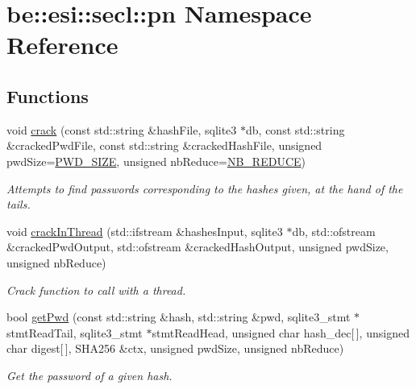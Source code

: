 \hypertarget{namespacebe_1_1esi_1_1secl_1_1pn}{}\section{be\+:\+:esi\+:\+:secl\+:\+:pn Namespace Reference}
\label{namespacebe_1_1esi_1_1secl_1_1pn}
\subsection*{Functions}
\begin{DoxyCompactItemize}
\item 
void \hyperlink{namespacebe_1_1esi_1_1secl_1_1pn_a56fa00c405a4fb0e6446717fb1390493}{crack} (const std\+::string \&hash\+File, sqlite3 $\ast$db, const std\+::string \&cracked\+Pwd\+File, const std\+::string \&cracked\+Hash\+File, unsigned pwd\+Size=\hyperlink{namespacebe_1_1esi_1_1secl_1_1pn_a233e474af3fb15b935a71709407307ec}{P\+W\+D\+\_\+\+S\+I\+ZE}, unsigned nb\+Reduce=\hyperlink{namespacebe_1_1esi_1_1secl_1_1pn_a712c184235263459041b774c8229fc1b}{N\+B\+\_\+\+R\+E\+D\+U\+CE})
\begin{DoxyCompactList}\small\item\em Attempts to find passwords corresponding to the hashes given, at the hand of the tails. \end{DoxyCompactList}\item 
void \hyperlink{namespacebe_1_1esi_1_1secl_1_1pn_a2e1d887d50e74bfd7abd4fc851105d03}{crack\+In\+Thread} (std\+::ifstream \&hashes\+Input, sqlite3 $\ast$db, std\+::ofstream \&cracked\+Pwd\+Output, std\+::ofstream \&cracked\+Hash\+Output, unsigned pwd\+Size, unsigned nb\+Reduce)
\begin{DoxyCompactList}\small\item\em Crack function to call with a thread. \end{DoxyCompactList}\item 
bool \hyperlink{namespacebe_1_1esi_1_1secl_1_1pn_ac120109a2cf821caf30a22857d66985b}{get\+Pwd} (const std\+::string \&hash, std\+::string \&pwd, sqlite3\+\_\+stmt $\ast$stmt\+Read\+Tail, sqlite3\+\_\+stmt $\ast$stmt\+Read\+Head, unsigned char hash\+\_\+dec\mbox{[}$\,$\mbox{]}, unsigned char digest\mbox{[}$\,$\mbox{]}, S\+H\+A256 \&ctx, unsigned pwd\+Size, unsigned nb\+Reduce)
\begin{DoxyCompactList}\small\item\em Get the password of a given hash. \end{DoxyCompactList}\item 

\end{DoxyCompactItemize}
